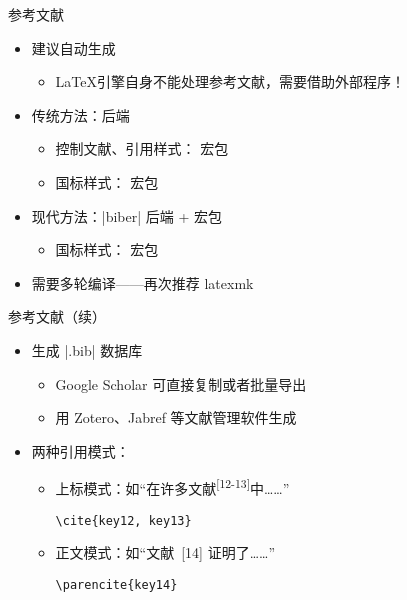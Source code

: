 \begin{frame}[fragile]{参考文献}
  \begin{itemize}
    \item 建议自动生成
          \begin{itemize}
            \item \LaTeX 引擎自身不能处理参考文献，需要借助外部程序！
          \end{itemize}
    \item 传统方法：\BibTeX 后端
          \begin{itemize}
            \item 控制文献、引用样式： 宏包
            \item 国标样式： 宏包 
          \end{itemize}
    \item 现代方法：|biber| 后端 +  宏包
          \begin{itemize}
            \item 国标样式： 宏包 
          \end{itemize}
    \item 需要多轮编译——再次推荐 latexmk
  \end{itemize}
\end{frame}

\begin{frame}[fragile]{参考文献（续）}
  \begin{itemize}
    \item 生成 |.bib| 数据库
          \begin{itemize}
            \item Google Scholar 可直接复制或者批量导出
            \item 用 Zotero、Jabref 等文献管理软件生成
          \end{itemize}
    \item 两种引用模式：
          \begin{itemize}
            \item 上标模式：如“在许多文献\textsuperscript{[12-13]}中……”
                  \begin{lstlisting}[basicstyle=\ttfamily]
    \cite{key12, key13}
          \end{lstlisting}
            \item 正文模式：如“文献~[14] 证明了……”
                  \begin{lstlisting}[basicstyle=\ttfamily]
    \parencite{key14}
          \end{lstlisting}
          \end{itemize}
  \end{itemize}
\end{frame}


